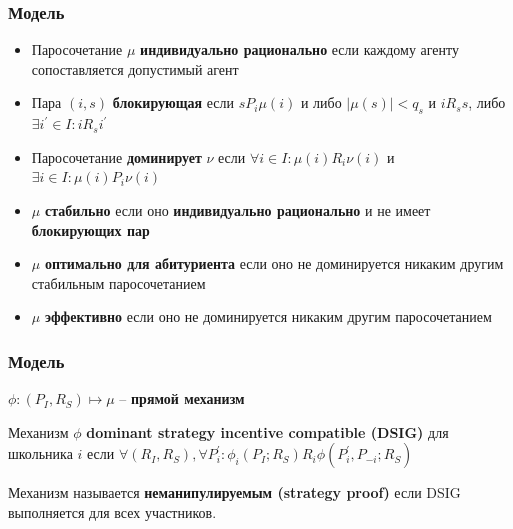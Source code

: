 \documentclass[10pt,pdf,hyperref={unicode}]{beamer}
\begin{document}
\begin{frame}
    \frametitle{Модель}
    \begin{itemize}
        \item Паросочетание $\mu$ {\bf индивидуально рационально} если каждому агенту сопоставляется допустимый агент
        \item Пара $(i, s)$ {\bf блокирующая} если $s P_i \mu(i)$ и либо $|\mu(s)| < q_s$ и $i R_s s$, либо  $\exists i^\prime \in I: i R_s i^\prime$
        \item Паросочетание {\bf доминирует} $\nu$ если $\forall i \in I: \mu(i) R_i \nu(i)$ и $\exists i \in I: \mu(i) P_i \nu(i)$
        \item $\mu$ {\bf стабильно} если оно {\bf индивидуально рационально} и не имеет {\bf блокирующих пар}
        \item $\mu$ {\bf оптимально для абитуриента} если оно не доминируется никаким другим стабильным паросочетанием
        \item $\mu$ {\bf эффективно} если оно не доминируется никаким другим паросочетанием
    \end{itemize}
\end{frame}

\begin{frame}
    \frametitle{Модель}
    \begin{definition}
        $\phi: (P_I, R_S) \longmapsto \mu$ -- {\bf прямой механизм} 
    \end{definition}

    \begin{definition}
        Механизм $\phi$ {\bf dominant strategy incentive compatible (DSIG)} для школьника $i$ если $\forall (R_I, R_S), \forall P_i^\prime: \phi_i(P_I; R_S) R_i \phi(P_i^\prime, P_{-i}; R_S)$
    \end{definition}

    \begin{definition}
        Механизм называется {\bf неманипулируемым (strategy proof)} если DSIG выполняется для всех участников.
    \end{definition}
\end{frame}
\end{document}
